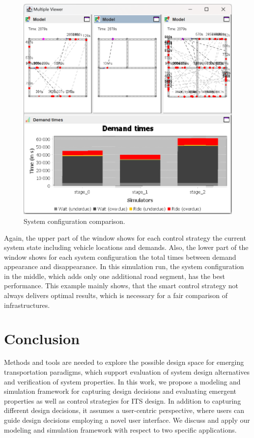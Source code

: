 \documentclass[a4paper,twoside]{article}
\begin{document}
	\begin{figure}[!ht]
		\includegraphics[width=\columnwidth]{infrastructure_comparison.png}
		\caption{System configuration comparison.}
		\label{fig:infratructure-comparison}
	\end{figure}
	
	Again, the upper part of the window shows for each control strategy the current system state including vehicle locations and demands.
	Also, the lower part of the window shows for each system configuration the total times between demand appearance and disappearance.
	In this simulation run, the system configuration in the middle, which adds only one additional road segment, has the best performance.
	This example mainly shows, that the smart control strategy not always delivers optimal results, which is necessary for a fair comparison of infrastructures.
	
	\section{Conclusion}
	\label{sec:conclusion}
	
Methods and tools are needed to explore the possible design space for emerging transportation paradigms, which support evaluation of system design alternatives and verification of system properties. In this work, we propose a modeling and simulation framework for capturing design decisions and evaluating emergent properties as well as control strategies for ITS design. In addition to capturing different design decisions, it assumes a user-centric perspective, where users can guide design decisions employing a novel user interface. We discuss and apply our modeling and simulation framework with respect to two specific applications.
	
	
	
	{\small
		}
	
	
\end{document}
